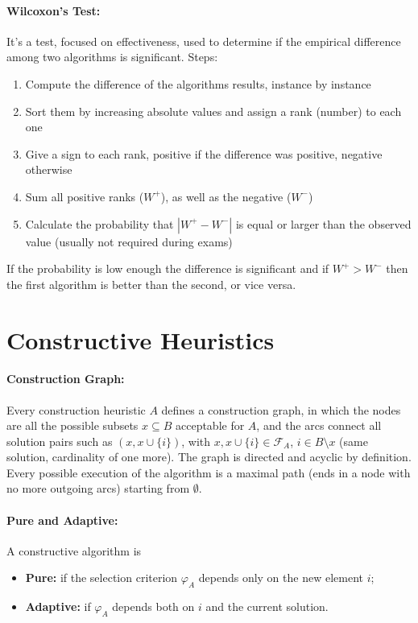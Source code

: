 \documentclass{article}
\begin{document}
	\paragraph{Wilcoxon's Test:} It's a test, focused on effectiveness, used to determine if the empirical difference among two algorithms is significant. Steps:
	\begin{enumerate}
		\item Compute the difference of the algorithms results, instance by instance
		\item Sort them by increasing absolute values and assign a rank (number) to each one
		\item Give a sign to each rank, positive if the difference was positive, negative otherwise
		\item Sum all positive ranks ($W^+$), as well as the negative ($W^-$)
		\item Calculate the probability that $|W^+ - W^-|$ is equal or larger than the observed value (usually not required during exams)
	\end{enumerate}
	If the probability is low enough the difference is significant and if $W^+ > W^-$ then the first algorithm is better than the second, or vice versa.\\
	
	\section*{Constructive Heuristics}
	
	\paragraph{Construction Graph:} Every construction heuristic $A$ defines a construction graph, in which the nodes are all the possible subsets $x \subseteq B$ acceptable for $A$, and the arcs connect all solution pairs such as $(x, x \cup \{i\})$, with $x, x \cup \{i\} \in \mathcal{F}_A$, $i \in B \setminus x$ (same solution, cardinality of one more). The graph is directed and acyclic by definition. Every possible execution of the algorithm is a maximal path (ends in a node with no more outgoing arcs) starting from $\emptyset$.\\
	
	\paragraph{Pure and Adaptive:} A constructive algorithm is 
	\begin{itemize}
		\item \textbf{Pure:} if the selection criterion $\varphi_A$ depends only on the new element $i$;
		\item \textbf{Adaptive:} if $\varphi_A$ depends both on $i$ and the current solution.\\
	\end{itemize}
	
\end{document}
